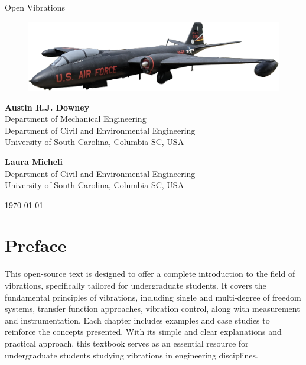 \documentclass[12pt,letter]{article}
\begin{document}
\thispagestyle{empty}	

\begin{center}
	{\fontsize{50}{60}\selectfont Open Vibrations}
	
	\vspace{3cm}
	
	\begin{figure}[H]
		\includegraphics[width=6.5in]{figures/Martin_B-57_Canberra.png}
		\label{fig:title_figure}
	\end{figure} 
	
	\vspace{4cm}
	
	\textbf{Austin R.J. Downey}\\ Department of Mechanical Engineering \\ Department of Civil and Environmental Engineering \\ University of South Carolina, Columbia SC, USA 
	
	\vspace{1cm}
	
	\textbf{Laura Micheli}\\ Department of Civil and Environmental Engineering \\ University of South Carolina, Columbia SC, USA 
	



	\vspace*{\fill}
	
	\today


\end{center}

\pagebreak

\pagebreak
\setcounter{page}{1}
\tableofcontents



\pagebreak

\setcounter{secnumdepth}{0} %

\section{Preface}
This open-source text is designed to offer a complete introduction to the field of vibrations, specifically tailored for undergraduate students. It covers the fundamental principles of vibrations, including single and multi-degree of freedom systems, transfer function approaches, vibration control, along with measurement and instrumentation. Each chapter includes examples and case studies to reinforce the concepts presented. With its simple and clear explanations and practical approach, this textbook serves as an essential resource for undergraduate students studying vibrations in engineering disciplines.
\end{document}
